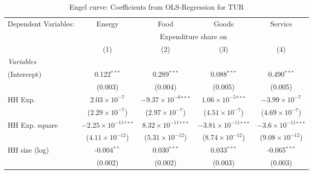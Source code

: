
\begin{table}[htbp!]
   \centering
   \small
   \begin{adjustbox}{width = 1\textwidth, max height = 0.95\textheight, center}
      \begin{threeparttable}[b]
         \caption{\label{tab:Engel_parametric_TUR} Engel curve: Coefficients from OLS-Regression for TUR}
         \begin{tabular}{lcccc}
            \tabularnewline \midrule \midrule
            Dependent Variables: & Energy                          & Food                           & Goods                           & Service\\  
             & \multicolumn{4}{c}{Expenditure share on} \\ 
                                 & (1)                             & (2)                            & (3)                             & (4)\\  
            \midrule
            \emph{Variables}\\
            (Intercept)          & 0.122$^{***}$                   & 0.289$^{***}$                  & 0.088$^{***}$                   & 0.490$^{***}$\\   
                                 & (0.003)                         & (0.004)                        & (0.005)                         & (0.005)\\   
            HH Exp.              & $2.03\times 10^{-7}$            & $-9.37\times 10^{-6}$$^{***}$  & $1.06\times 10^{-5}$$^{***}$    & $-3.99\times 10^{-7}$\\    
                                 & ($2.29\times 10^{-7}$)          & ($2.97\times 10^{-7}$)         & ($4.51\times 10^{-7}$)          & ($4.69\times 10^{-7}$)\\    
            HH Exp. square       & $-2.25\times 10^{-11}$$^{***}$  & $8.32\times 10^{-11}$$^{***}$  & $-3.81\times 10^{-11}$$^{***}$  & $-3.6\times 10^{-11}$$^{***}$\\    
                                 & ($4.11\times 10^{-12}$)         & ($5.31\times 10^{-12}$)        & ($8.74\times 10^{-12}$)         & ($9.08\times 10^{-12}$)\\    
            HH size (log)        & -0.004$^{**}$                   & 0.030$^{***}$                  & 0.033$^{***}$                   & -0.065$^{***}$\\   
                                 & (0.002)                         & (0.002)                        & (0.003)                         & (0.003)\\   

\end{tabular}
\end{threeparttable}
\end{adjustbox}
\end{table}
